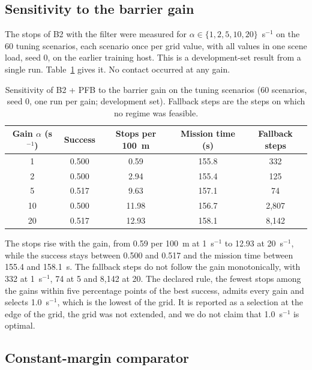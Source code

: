 \subsection{Sensitivity to the barrier gain}

The stops of B2 with the filter were measured for $\alpha \in \{1, 2, 5, 10, 20\}$~s$^{-1}$ on the 60 tuning scenarios, each scenario once per grid value, with all values in one scene load, seed 0, on the earlier training host. This is a development-set result from a single run. Table~\ref{tab:alpha} gives it. No contact occurred at any gain.

\begin{table}[t]
\caption{Sensitivity of B2 + PFB to the barrier gain on the tuning scenarios (60 scenarios, seed 0, one run per gain; development set). Fallback steps are the steps on which no regime was feasible.}
\label{tab:alpha}
\centering
\small
\setlength{\tabcolsep}{4pt}
\begin{tabular}{ccccc}
\toprule
Gain $\alpha$ (s$^{-1}$) & Success & Stops per 100~m & Mission time (s) & Fallback steps \\
\midrule
1 & 0.500 & 0.59 & 155.8 & 332 \\
2 & 0.500 & 2.94 & 155.4 & 125 \\
5 & 0.517 & 9.63 & 157.1 & 74 \\
10 & 0.500 & 11.98 & 156.7 & 2,807 \\
20 & 0.517 & 12.93 & 158.1 & 8,142 \\
\bottomrule
\end{tabular}
\end{table}

The stops rise with the gain, from 0.59 per 100~m at 1~s$^{-1}$ to 12.93 at 20~s$^{-1}$, while the success stays between 0.500 and 0.517 and the mission time between 155.4 and 158.1~s. The fallback steps do not follow the gain monotonically, with 332 at 1~s$^{-1}$, 74 at 5 and 8,142 at 20. The declared rule, the fewest stops among the gains within five percentage points of the best success, admits every gain and selects 1.0~s$^{-1}$, which is the lowest of the grid. It is reported as a selection at the edge of the grid, the grid was not extended, and we do not claim that 1.0~s$^{-1}$ is optimal.

\subsection{Constant-margin comparator}


